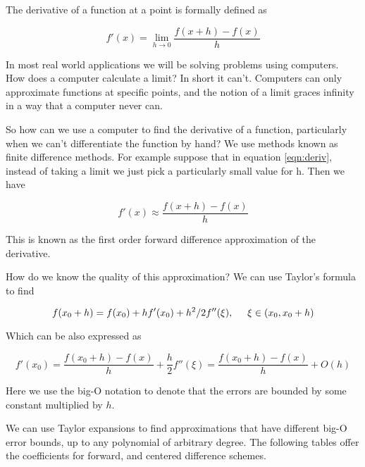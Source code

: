 \label{Ch:Numerical Derivatives}


The derivative of a function at a point is formally defined as

\begin{equation}
\label{eqn:deriv}
f'(x) = \lim_{h\rightarrow 0} \frac{f(x + h)-f(x)}{h}
\end{equation}

In most real world applications we will be solving problems using computers. How does a computer calculate a limit? In short it can't. Computers can only approximate functions at specific points, and the notion of a limit graces infinity in a way that a computer never can.

So how can we use a computer to find the derivative of a function, particularly when we can't differentiate the function by hand? We use methods known as finite difference methods. For example suppose that in equation \ref{eqn:deriv}, instead of taking a limit we just pick a particularly small value for h. Then we have

\begin{equation*}
f'(x) \approx \frac{f(x + h)-f(x)}{h}
\end{equation*}

This is known as the first order forward difference approximation of the derivative.

How do we know the quality of this approximation? We can use Taylor's formula to find

\begin{equation*}
f(x_0 + h) = f(x_0) + hf'(x_0) + h^2/2 f''(\xi),\hspace{5mm} \xi \in (x_0,x_0 + h)
\end{equation*}

Which can be also expressed as

\begin{equation*}
f'(x_0) = \frac{f(x_0 + h) - f(x)}{h} + \frac{h}{2}
f''(\xi) = \frac{f(x_0 + h) - f(x)}{h} + O(h)
\end{equation*}

Here we use the big-O notation to denote that the errors are bounded by some constant multiplied by $h$.

We can use Taylor expansions to find approximations that have different big-O error bounds, up to any polynomial of arbitrary degree. The following tables offer the coefficients for forward, and centered difference schemes.

